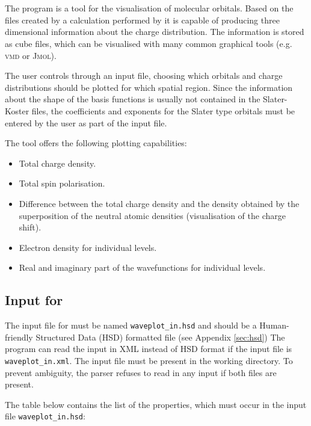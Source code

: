 \chapter{\waveplot}

The \waveplot{} program is a tool for the visualisation of molecular orbitals.
Based on the files created by a calculation performed by \dftbp{} it is capable
of producing three dimensional information about the charge distribution. The
information is stored as cube files, which can be visualised with many common
graphical tools (e.g. \textsc{vmd} or \textsc{Jmol}).

The user controls \waveplot{} through an input file, choosing which
orbitals and charge distributions should be plotted for which spatial
region. Since the information about the shape of the basis functions
is usually not contained in the Slater-Koster files, the coefficients
and exponents for the Slater type orbitals must be entered by the user
as part of the input file.

The \waveplot{} tool offers the following plotting capabilities:
\begin{itemize}
\item Total charge density.
\item Total spin polarisation.
\item Difference between the total charge density and the density
  obtained by the superposition of the neutral atomic densities
  (visualisation of the charge shift).
\item Electron density for individual levels.
\item Real and imaginary part of the wavefunctions for individual levels.
\end{itemize}


\section{Input for \waveplot}

The input file for \waveplot{} must be named \verb|waveplot_in.hsd| and should
be a Human-friendly Structured Data (HSD) formatted file (see Appendix
\ref{sec:hsd}) The program can read the input in XML instead of HSD format if
the input file is \verb|waveplot_in.xml|. The input file must be present in the
working directory. To prevent ambiguity, the parser refuses to read in any input
if both files are present.

The table below contains the list of the properties, which must occur in the
input file \verb|waveplot_in.hsd|:

